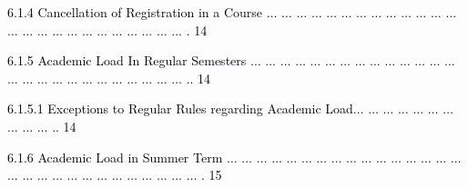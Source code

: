 \documentclass[12pt]{article}
\begin{document}
\vspace{\baselineskip}
\begin{adjustwidth}{0.5in}{0.0in}
{\fontsize{7pt}{8.4pt}\selectfont \textcolor[HTML]{00000A}{6.1.4 Cancellation of Registration in a Course $ \ldots $ $ \ldots $ $ \ldots $ $ \ldots $ $ \ldots $ $ \ldots $ $ \ldots $ $ \ldots $ $ \ldots $ $ \ldots $ $ \ldots $ $ \ldots $ $ \ldots $ $ \ldots $ $ \ldots $ $ \ldots $ $ \ldots $ $ \ldots $ $ \ldots $ $ \ldots $ $ \ldots $ $ \ldots $ $ \ldots $ $ \ldots $ $ \ldots $ . 14}\par}\par

\end{adjustwidth}


\vspace{\baselineskip}
\begin{adjustwidth}{0.5in}{0.0in}
{\fontsize{7pt}{8.4pt}\selectfont \textcolor[HTML]{00000A}{6.1.5 Academic Load In Regular Semesters $ \ldots $ $ \ldots $ $ \ldots $ $ \ldots $ $ \ldots $ $ \ldots $ $ \ldots $ $ \ldots $ $ \ldots $ $ \ldots $ $ \ldots $ $ \ldots $ $ \ldots $ $ \ldots $ $ \ldots $ $ \ldots $ $ \ldots $ $ \ldots $ $ \ldots $ $ \ldots $ $ \ldots $ $ \ldots $ $ \ldots $ $ \ldots $ $ \ldots $ $ \ldots $ .. 14}\par}\par

\end{adjustwidth}


\vspace{\baselineskip}
\begin{adjustwidth}{1.0in}{0.0in}
{\fontsize{7pt}{8.4pt}\selectfont \textcolor[HTML]{00000A}{6.1.5.1 Exceptions to Regular Rules regarding Academic Load$ \ldots $ $ \ldots $ $ \ldots $ $ \ldots $ $ \ldots $ $ \ldots $ $ \ldots $ $ \ldots $ $ \ldots $ $ \ldots $ .. 14}\par}\par

\end{adjustwidth}


\vspace{\baselineskip}
\begin{adjustwidth}{0.5in}{0.0in}
{\fontsize{7pt}{8.4pt}\selectfont \textcolor[HTML]{00000A}{6.1.6 Academic Load in Summer Term $ \ldots $ $ \ldots $ $ \ldots $ $ \ldots $ $ \ldots $ $ \ldots $ $ \ldots $ $ \ldots $ $ \ldots $ $ \ldots $ $ \ldots $ $ \ldots $ $ \ldots $ $ \ldots $ $ \ldots $ $ \ldots $ $ \ldots $ $ \ldots $ $ \ldots $ $ \ldots $ $ \ldots $ $ \ldots $ $ \ldots $ $ \ldots $ $ \ldots $ $ \ldots $ $ \ldots $ $ \ldots $ $ \ldots $ . 15}\par}\par

\end{adjustwidth}
\end{document}

